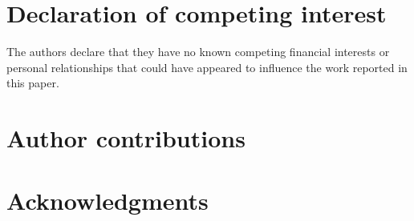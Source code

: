 \documentclass[a4paper,fleqn]{cas-dc}
\begin{document}
\section*{Declaration of competing interest}

The authors declare that they have no known competing financial interests or personal relationships that could have appeared to influence the work reported in this paper.

\section*{Author contributions}



\section*{Acknowledgments}





\end{document}
